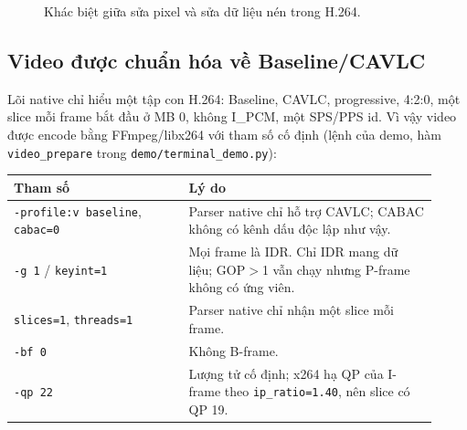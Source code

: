 \documentclass[11pt,a4paper]{article}
\begin{document}
\begin{figure}[H]
\centering
{}
\caption{Khác biệt giữa sửa pixel và sửa dữ liệu nén trong H.264.}
\label{fig:pixel-vs-compressed}
\end{figure}

\subsection{Video được chuẩn hóa về Baseline/CAVLC}

Lõi native chỉ hiểu một tập con H.264: Baseline, CAVLC, progressive, 4:2:0, một
slice mỗi frame bắt đầu ở MB 0, không I\_PCM, một SPS/PPS id. Vì vậy video được
encode bằng FFmpeg/libx264 với tham số cố định (lệnh của demo, hàm
\texttt{video\_prepare} trong \texttt{demo/terminal\_demo.py}):

\begin{center}
\small
\begin{tabular}{p{0.38\linewidth}p{0.54\linewidth}}
\toprule
Tham số & Lý do \\
\midrule
\texttt{-profile:v baseline}, \texttt{cabac=0} & Parser native chỉ hỗ trợ CAVLC; CABAC không có kênh dấu độc lập như vậy. \\
\texttt{-g 1} / \texttt{keyint=1} & Mọi frame là IDR. Chỉ IDR mang dữ liệu; GOP\(>\)1 vẫn chạy nhưng P-frame không có ứng viên. \\
\texttt{slices=1}, \texttt{threads=1} & Parser native chỉ nhận một slice mỗi frame. \\
\texttt{-bf 0} & Không B-frame. \\
\texttt{-qp 22} & Lượng tử cố định; x264 hạ QP của I-frame theo \texttt{ip\_ratio=1.40}, nên slice có QP 19. \\
\bottomrule
\end{tabular}
\end{center}
\end{document}
